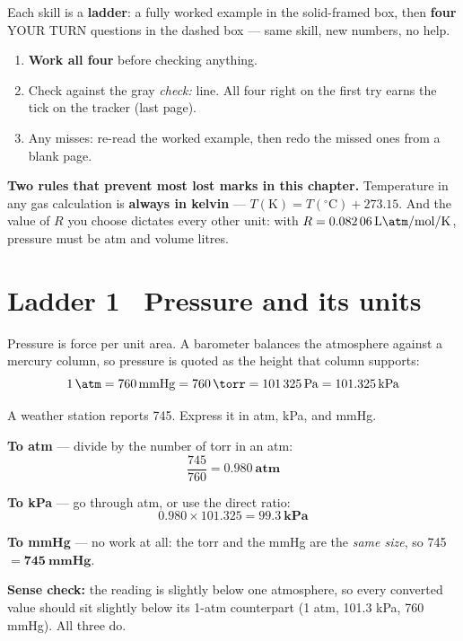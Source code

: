 \documentclass{apchem-worksheet}
\begin{document}
\apctitleblock

\begin{apcnote}
Each skill is a \textbf{ladder}: a fully worked example in the
solid-framed box, then \textbf{four} YOUR TURN questions in the dashed
box --- same skill, new numbers, no help.

\begin{enumerate}[leftmargin=*,itemsep=0.15em]
  \item \textbf{Work all four} before checking anything.
  \item Check against the gray \emph{check:} line. All four right on the
        first try earns the tick on the tracker (last page).
  \item Any misses: re-read the worked example, then redo the missed ones
        from a blank page.
\end{enumerate}

\textbf{Two rules that prevent most lost marks in this chapter.}
Temperature in any gas calculation is \textbf{always in kelvin} ---
$T(\mathrm{K}) = T(^\circ\mathrm{C}) + 273.15$. And the value of $R$ you
choose dictates every other unit: with
$R = \SI{0.08206}{\litre\atm\per\mole\per\kelvin}$, pressure must be atm
and volume litres.
\end{apcnote}

\section*{\sffamily Ladder 1 \textbullet\ Pressure and its units}

Pressure is force per unit area. A barometer balances the atmosphere
against a mercury column, so pressure is quoted as the height that column
supports:
\[ \SI{1}{\atm} = \SI{760}{\mmHg} = \SI{760}{\torr}
   = \SI{101325}{\pascal} = \SI{101.325}{\kilo\pascal} \]

\begin{workedexample}
A weather station reports \SI{745}{\torr}. Express it in atm, kPa, and
mmHg.

\textbf{To atm} --- divide by the number of torr in an atm:
\[ \frac{745}{760} = \mathbf{0.980~atm} \]

\textbf{To kPa} --- go through atm, or use the direct ratio:
\[ 0.980 \times 101.325 = \mathbf{99.3~kPa} \]

\textbf{To mmHg} --- no work at all: the torr and the mmHg are the
\emph{same size}, so \SI{745}{\torr} $= \mathbf{745~mmHg}$.

\textbf{Sense check:} the reading is slightly below one atmosphere, so
every converted value should sit slightly below its 1-atm counterpart
(1 atm, 101.3 kPa, 760 mmHg). All three do.
\end{workedexample}
\end{document}
